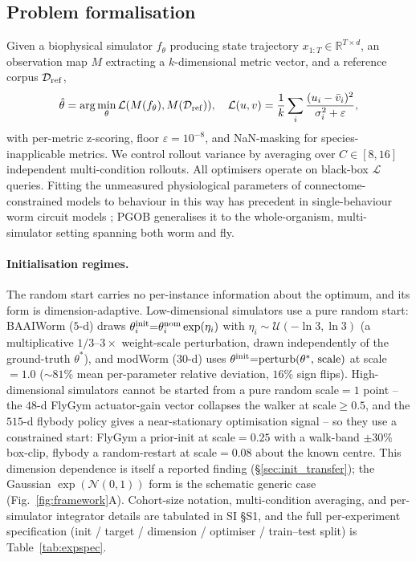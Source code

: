 \documentclass[11pt]{article}
\begin{document}
\subsection{Problem formalisation}
Given a biophysical simulator $f_\theta$ producing state trajectory $x_{1:T}\in\mathbb{R}^{T\times d}$, an observation map $M$ extracting a $k$-dimensional metric vector, and a reference corpus $\mathcal{D}_{\rm ref}$,
\begin{equation}
\hat\theta = \arg\min_\theta \mathcal{L}(M(f_\theta), M(\mathcal{D}_{\rm ref})),\quad \mathcal{L}(u,v) = \frac{1}{k}\sum_i \frac{(u_i-\bar v_i)^2}{\sigma_i^2+\varepsilon},
\end{equation}
with per-metric z-scoring, floor $\varepsilon{=}10^{-8}$, and NaN-masking for species-inapplicable metrics. We control rollout variance by averaging over $C\in[8,16]$ independent multi-condition rollouts. All optimisers operate on black-box $\mathcal{L}$ queries. Fitting the unmeasured physiological parameters of connectome-constrained models to behaviour in this way has precedent in single-behaviour worm circuit models \citep{izquierdo2013connecting,izquierdo2018connecting}; PGOB generalises it to the whole-organism, multi-simulator setting spanning both worm and fly.

\paragraph{Initialisation regimes.} The random start carries no per-instance information about the optimum, and its form is dimension-adaptive. Low-dimensional simulators use a pure random start: BAAIWorm ($5$-d) draws $\theta_i^{\rm init}{=}\theta_i^{\rm nom}\exp(\eta_i)$ with $\eta_i\sim\mathcal{U}(-\ln 3,\ln 3)$ (a multiplicative $1/3$--$3\times$ weight-scale perturbation, drawn independently of the ground-truth $\theta^{*}$), and modWorm ($30$-d) uses $\theta^{\rm init}{=}\mathrm{perturb}(\theta^{*},\,\mathrm{scale})$ at scale${=}1.0$ ($\sim81\%$ mean per-parameter relative deviation, $16\%$ sign flips). High-dimensional simulators cannot be started from a pure random scale${=}1$ point -- the $48$-d FlyGym actuator-gain vector collapses the walker at scale${\ge}0.5$, and the $515$-d flybody policy gives a near-stationary optimisation signal -- so they use a constrained start: FlyGym a prior-init at scale${=}0.25$ with a walk-band $\pm30\%$ box-clip, flybody a random-restart at scale${=}0.08$ about the known centre. This dimension dependence is itself a reported finding (\S\ref{sec:init_transfer}); the Gaussian $\exp(\mathcal{N}(0,1))$ form is the schematic generic case (Fig.~\ref{fig:framework}A). Cohort-size notation, multi-condition averaging, and per-simulator integrator details are tabulated in SI \S S1, and the full per-experiment specification (init / target / dimension / optimiser / train--test split) is Table~\ref{tab:expspec}.
\end{document}
